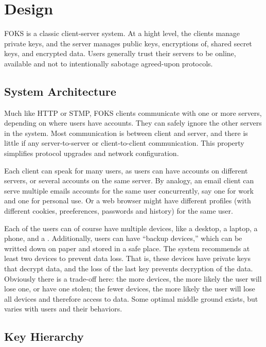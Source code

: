 
\section{Design}
\label{sec:design}

FOKS is a classic client-server system. At a hight level, the clients
manage private keys, and the server manages public keys, encryptions of, 
shared secret keys, and encrypted data. Users generally trust their
servers to be online, available and not to intentionally sabotage
agreed-upon protocols. 

\subsection{System Architecture}

Much like HTTP or STMP, FOKS clients communicate with one or more servers,
depending on where users have accounts. They can safely ignore the other servers
in the system. Most communication is between client and server, and there is
little if any server-to-server or client-to-client communication.  This
property simplifies protocol upgrades and network configuration.

Each client can speak for many users, as users can have accounts on different
servers, or several accounts on the same server. By analogy, an email client can
serve multiple emails accounts for the same user concurrently, say one for work
and one for personal use. Or a web browser might have different profiles (with
different cookies, preeferences, passwords and history) for the same user.

Each of the users can of course have multiple devices, like a desktop, a laptop,
a phone, and a \yubi . Additionally, users can have ``backup devices,'' which can
be writted down on paper and stored in a safe place. The system recommends at
least two devices to prevent data loss. That is, these devices have private keys
that decrypt data, and the loss of the last key prevents decryption of the data.
Obviously there is a trade-off here: the more devices, the more likely the user
will lose one, or have one stolen; the fewer devices, the more likely the user
will lose all devices and therefore access to data. Some optimal middle ground
exists, but varies with users and their behaviors. 

\subsection{Key Hierarchy}

